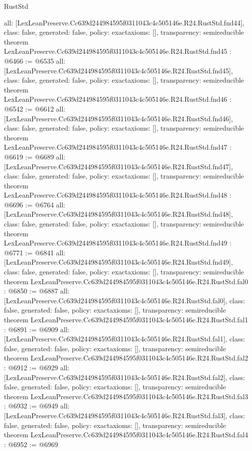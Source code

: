 \begin{lexlean}{RustStd}
\begin{coremodule}
{  all: [LexLeanPreserve.Cc639d244984595f0311043c4c505146e.R24.RustStd.fnd44],
  class: false,
  generated: false,
  policy: exact{axioms: []},
  transparency: semireducible
}
theorem LexLeanPreserve.Cc639d244984595f0311043c4c505146e.R24.RustStd.fnd45 : @6466 := @6535 {
  all: [LexLeanPreserve.Cc639d244984595f0311043c4c505146e.R24.RustStd.fnd45],
  class: false,
  generated: false,
  policy: exact{axioms: []},
  transparency: semireducible
}
theorem LexLeanPreserve.Cc639d244984595f0311043c4c505146e.R24.RustStd.fnd46 : @6542 := @6612 {
  all: [LexLeanPreserve.Cc639d244984595f0311043c4c505146e.R24.RustStd.fnd46],
  class: false,
  generated: false,
  policy: exact{axioms: []},
  transparency: semireducible
}
theorem LexLeanPreserve.Cc639d244984595f0311043c4c505146e.R24.RustStd.fnd47 : @6619 := @6689 {
  all: [LexLeanPreserve.Cc639d244984595f0311043c4c505146e.R24.RustStd.fnd47],
  class: false,
  generated: false,
  policy: exact{axioms: []},
  transparency: semireducible
}
theorem LexLeanPreserve.Cc639d244984595f0311043c4c505146e.R24.RustStd.fnd48 : @6696 := @6764 {
  all: [LexLeanPreserve.Cc639d244984595f0311043c4c505146e.R24.RustStd.fnd48],
  class: false,
  generated: false,
  policy: exact{axioms: []},
  transparency: semireducible
}
theorem LexLeanPreserve.Cc639d244984595f0311043c4c505146e.R24.RustStd.fnd49 : @6771 := @6841 {
  all: [LexLeanPreserve.Cc639d244984595f0311043c4c505146e.R24.RustStd.fnd49],
  class: false,
  generated: false,
  policy: exact{axioms: []},
  transparency: semireducible
}
theorem LexLeanPreserve.Cc639d244984595f0311043c4c505146e.R24.RustStd.fal0 : @6850 := @6887 {
  all: [LexLeanPreserve.Cc639d244984595f0311043c4c505146e.R24.RustStd.fal0],
  class: false,
  generated: false,
  policy: exact{axioms: []},
  transparency: semireducible
}
theorem LexLeanPreserve.Cc639d244984595f0311043c4c505146e.R24.RustStd.fal1 : @6891 := @6909 {
  all: [LexLeanPreserve.Cc639d244984595f0311043c4c505146e.R24.RustStd.fal1],
  class: false,
  generated: false,
  policy: exact{axioms: []},
  transparency: semireducible
}
theorem LexLeanPreserve.Cc639d244984595f0311043c4c505146e.R24.RustStd.fal2 : @6912 := @6929 {
  all: [LexLeanPreserve.Cc639d244984595f0311043c4c505146e.R24.RustStd.fal2],
  class: false,
  generated: false,
  policy: exact{axioms: []},
  transparency: semireducible
}
theorem LexLeanPreserve.Cc639d244984595f0311043c4c505146e.R24.RustStd.fal3 : @6932 := @6949 {
  all: [LexLeanPreserve.Cc639d244984595f0311043c4c505146e.R24.RustStd.fal3],
  class: false,
  generated: false,
  policy: exact{axioms: []},
  transparency: semireducible
}
theorem LexLeanPreserve.Cc639d244984595f0311043c4c505146e.R24.RustStd.fal4 : @6952 := @6969 {
}
\end{coremodule}
\end{lexlean}

